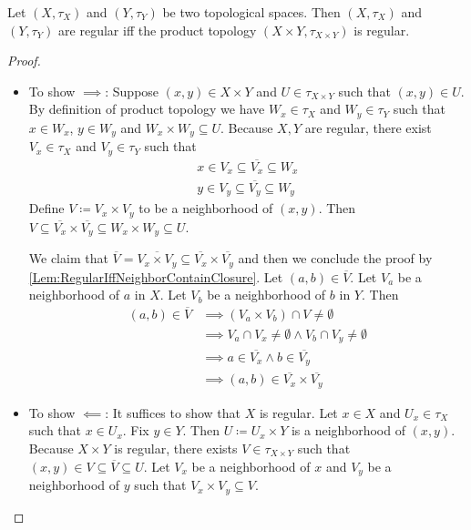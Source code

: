 \documentclass[screen]{techreport}
\numberwithin{equation}{section}
\begin{document}
\begin{theorem}\label{The:ProductOfRegularStillRegular}
	Let $(X,\tau_X)$ and $(Y,\tau_Y)$ be two topological spaces.
	Then $(X,\tau_X)$ and $(Y,\tau_Y)$ are regular iff the product topology $(X \times Y, \tau_{X \times Y})$ is regular.
\end{theorem}
\begin{proof}\
	\begin{itemize}
		\item To show ${\implies}$: Suppose $(x,y) \in X \times Y$ and $U \in \tau_{X \times Y}$ such that $(x,y) \in U$.
		By definition of product topology we have $W_x \in \tau_X$ and $W_y \in \tau_Y$ such that $x \in W_x$, $y \in W_y$ and $W_x \times W_y \subseteq U$.
		Because $X,Y$ are regular, there exist $V_x \in \tau_X$ and $V_y \in \tau_Y$ such that
		\begin{gather*}
			x \in V_x \subseteq \overline{V_x} \subseteq W_x \\
			y \in V_y \subseteq \overline{V_y} \subseteq W_y
		\end{gather*}
		Define $V \coloneqq V_x \times V_y$ to be a neighborhood of $(x,y)$.
		Then $V \subseteq \overline{V_x} \times \overline{V_y} \subseteq W_x \times W_y \subseteq U$.
		
		We claim that $\overline{V} = \overline{V_x \times V_y} \subseteq \overline{V_x} \times \overline{V_y} $ and then
		we conclude the proof by \cref{Lem:RegularIffNeighborContainClosure}.
		Let $(a,b) \in \overline{V}$.
		Let $V_a$ be a neighborhood of $a$ in $X$.
		Let $V_b$ be a neighborhood of $b$ in $Y$.
		Then
		\begin{align*}
			(a,b) \in \overline{V} & \implies (V_a \times V_b) \cap V \neq \emptyset \\
			& \implies V_a \cap V_x \neq \emptyset \wedge V_b \cap V_y \neq \emptyset \\
			& \implies a \in \overline{V_x} \wedge b \in \overline{V_y} \\
			& \implies (a,b) \in \overline{V_x} \times \overline{V_y}
		\end{align*}
		
		\item To show ${\impliedby}$: It suffices to show that $X$ is regular.
		Let $x \in X$ and $U_x \in \tau_X$ such that $x \in U_x$.
		Fix $y \in Y$. Then $U \coloneqq U_x \times Y$ is a neighborhood of $(x,y)$.
		Because $X \times Y$ is regular, there exists $V \in \tau_{X \times Y}$ such that $(x,y) \in V \subseteq \overline{V} \subseteq U$.
		Let $V_x$ be a neighborhood of $x$ and $V_y$ be a neighborhood of $y$ such that $V_x \times V_y \subseteq V$.
		

\end{itemize}
\end{proof}
\end{document}

